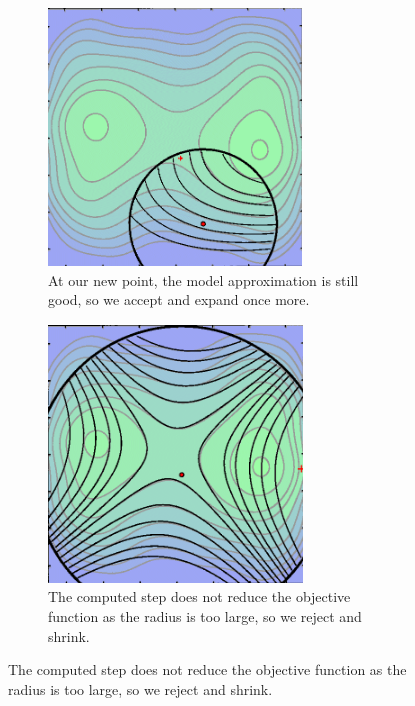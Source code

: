 \begin{figure}[H]
\begin{subfigure}[b]{0.32\linewidth}
        \includegraphics[width=\linewidth]{figures/2background/tr2.png}
        \caption{At our new point, the model approximation is still good, so we accept and expand once more.}
        \label{fig:tr_example_2}
    \end{subfigure}
    \hfill
    \begin{subfigure}[b]{0.32\linewidth}
        \centering
        \includegraphics[width=\linewidth]{figures/2background/tr3.png}
        \caption{The computed step does not reduce the objective function as the radius is too large, so we reject and shrink.}
        \label{fig:tr_example_3}
    \end{subfigure}
    

\end{figure}
